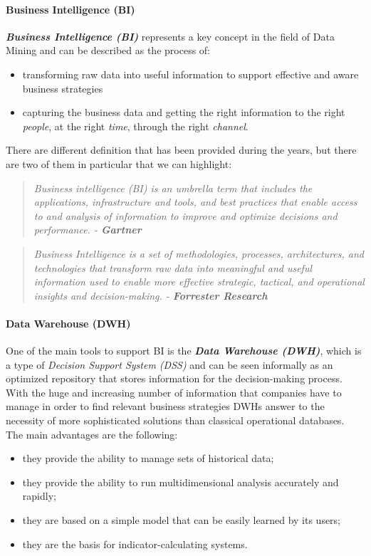\paragraph{Business Intelligence (BI)}
\textbf{\textit{Business Intelligence (BI)}} represents a key concept in the field of Data Mining and can be described as the process of:
\begin{itemize}
    \item transforming raw data into useful information to support effective and aware business strategies
    \item capturing the business data and getting the right information to the right \textit{people}, at the right \textit{time}, through the right \textit{channel}.
\end{itemize}
There are different definition that has been provided during the years, but there are two of them in particular that we can highlight:
\begin{quote}
    \textit{Business intelligence (BI) is an umbrella term that includes the applications, infrastructure and tools, and best practices that enable access to and analysis of information to improve and optimize decisions and performance. - \textbf{Gartner}}
\end{quote}
\begin{quote}
    \textit{Business Intelligence is a set of methodologies, processes, architectures, and technologies that transform raw data into meaningful and useful information used to enable more effective strategic, tactical, and operational insights and decision-making. - \textbf{Forrester Research}}
\end{quote}

\paragraph{Data Warehouse (DWH)}
One of the main tools to support BI is the \textbf{\textit{Data Warehouse (DWH)}}, which is a type of \textit{Decision Support System (DSS)} and can be seen informally as an optimized repository that stores information for the decision-making process. With the huge and increasing number of information that companies have to manage in order to find relevant business strategies DWHs answer to the necessity of more sophisticated solutions than classical operational databases.\\
The main advantages are the following:
\begin{itemize}
    \item they provide the ability to manage sets of historical data;
    \item they provide the ability to run multidimensional analysis accurately and rapidly;
    \item they are based on a simple model that can be easily learned by its users;
    \item they are the basis for indicator-calculating systems.
\end{itemize}

